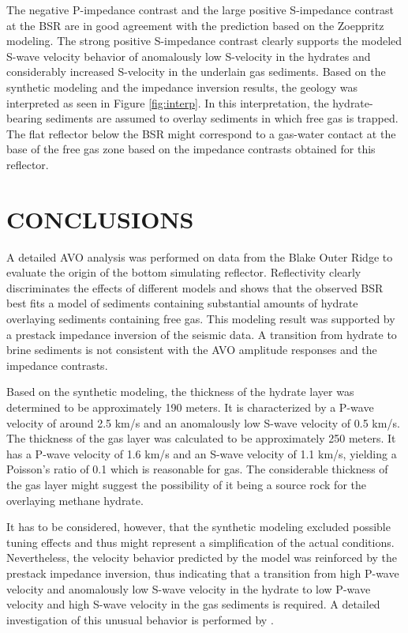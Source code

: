 
The negative P-impedance contrast and the large positive S-impedance contrast
at the BSR are in good agreement with the prediction based on the Zoeppritz 
modeling. The strong positive S-impedance contrast clearly supports the modeled
S-wave velocity behavior of anomalously low S-velocity in the hydrates and 
considerably increased S-velocity in the underlain gas sediments. Based on 
the synthetic modeling and the impedance inversion results, the geology was
interpreted as seen in Figure \ref{fig:interp}. In this interpretation, the
hydrate-bearing sediments are assumed to overlay sediments in which free gas
is trapped. The flat reflector below the BSR might correspond to a gas-water
contact at the base of the free gas zone based on the impedance contrasts
obtained for this reflector.

\notinteractive
{}
 

\section{CONCLUSIONS}

A detailed AVO analysis was performed on data from the Blake Outer Ridge to
evaluate the origin of the bottom simulating reflector. Reflectivity clearly
discriminates the effects of different models and shows that the observed 
BSR best fits a model of sediments containing substantial amounts of hydrate 
overlaying sediments containing free gas. This modeling result was supported 
by a prestack impedance inversion of the seismic data. A transition from 
hydrate to brine sediments is not consistent with the AVO amplitude responses
and the impedance contrasts. 
\par
Based on the synthetic modeling, the thickness of the hydrate layer was 
determined to be approximately 190 meters. It is characterized by a P-wave
velocity of around 2.5 km/s and an anomalously low S-wave velocity of 0.5 km/s.
The thickness of the gas layer was calculated to be approximately 250 meters.
It has a P-wave velocity of 1.6 km/s and an S-wave velocity of 1.1 km/s, 
yielding a Poisson's ratio of 0.1 which is reasonable for gas. The considerable
thickness of the gas layer might suggest the possibility of it being a source 
rock for the overlaying methane hydrate. 
\par
It has to be considered, however, that 
the synthetic modeling excluded possible tuning effects and thus might 
represent a simplification of the actual conditions. Nevertheless, the 
velocity behavior predicted by the model was reinforced by the prestack
impedance inversion, thus
indicating that a transition from high P-wave velocity and
anomalously low S-wave velocity in the hydrate to low P-wave velocity and high
S-wave velocity in the gas sediments is required. A detailed investigation of this 
unusual behavior is performed by \cite{Ecker.sep.80.christine2}.



